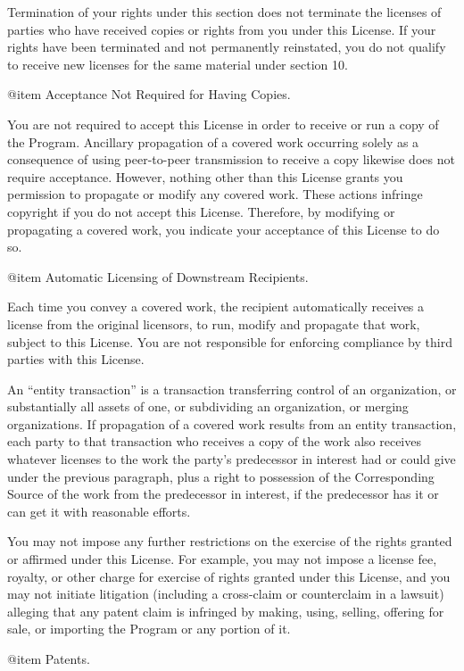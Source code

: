 Termination of your rights under this section does not terminate the
licenses of parties who have received copies or rights from you under
this License.  If your rights have been terminated and not permanently
reinstated, you do not qualify to receive new licenses for the same
material under section 10.

@item Acceptance Not Required for Having Copies.

You are not required to accept this License in order to receive or run
a copy of the Program.  Ancillary propagation of a covered work
occurring solely as a consequence of using peer-to-peer transmission
to receive a copy likewise does not require acceptance.  However,
nothing other than this License grants you permission to propagate or
modify any covered work.  These actions infringe copyright if you do
not accept this License.  Therefore, by modifying or propagating a
covered work, you indicate your acceptance of this License to do so.

@item Automatic Licensing of Downstream Recipients.

Each time you convey a covered work, the recipient automatically
receives a license from the original licensors, to run, modify and
propagate that work, subject to this License.  You are not responsible
for enforcing compliance by third parties with this License.

An ``entity transaction'' is a transaction transferring control of an
organization, or substantially all assets of one, or subdividing an
organization, or merging organizations.  If propagation of a covered
work results from an entity transaction, each party to that
transaction who receives a copy of the work also receives whatever
licenses to the work the party's predecessor in interest had or could
give under the previous paragraph, plus a right to possession of the
Corresponding Source of the work from the predecessor in interest, if
the predecessor has it or can get it with reasonable efforts.

You may not impose any further restrictions on the exercise of the
rights granted or affirmed under this License.  For example, you may
not impose a license fee, royalty, or other charge for exercise of
rights granted under this License, and you may not initiate litigation
(including a cross-claim or counterclaim in a lawsuit) alleging that
any patent claim is infringed by making, using, selling, offering for
sale, or importing the Program or any portion of it.

@item Patents.

